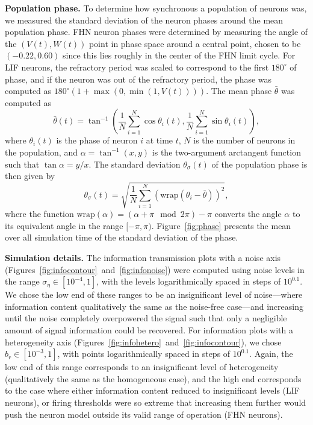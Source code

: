 \documentclass[12pt]{article}
\begin{document}
\textbf{Population phase.} To determine how synchronous a population of neurons was, we measured the standard deviation of the neuron phases around the mean population phase. FHN neuron phases were determined by measuring the angle of the $(V(t),W(t))$ point in phase space around a central point, chosen to be $(-0.22,0.60)$ since this lies roughly in the center of the FHN limit cycle. For LIF neurons, the refractory period was scaled to correspond to the first $180^\circ$ of phase, and if the neuron was out of the refractory period, the phase was computed as $180^\circ ( 1 + \max(0,\min(1,V(t))) )$. The mean phase $\bar\theta$ was computed as
\begin{equation}
  \bar\theta(t) = \tan^{-1} \left( \frac{1}{N}\sum\limits_{i=1}^N \cos\theta_i(t),
                                  \frac{1}{N}\sum\limits_{i=1}^N \sin\theta_i(t) \right),
\end{equation}
where $\theta_i(t)$ is the phase of neuron $i$ at time $t$, $N$ is the number of neurons in the population, and $\alpha = \tan^{-1}(x,y)$ is the two-argument arctangent function such that $\tan\alpha = y/x$. The standard deviation $\theta_\sigma(t)$ of the population phase is then given by
\begin{equation}
  \theta_\sigma(t) = \sqrt{ \frac{1}{N} \sum\limits_{i=1}^N (\mathrm{wrap}(\theta_i - \bar\theta))^2 },
\end{equation}
where the function $\mathrm{wrap}(\alpha) = (\alpha + \pi \mod 2\pi) - \pi$ converts the angle $\alpha$ to its equivalent angle in the range $[-\pi,\pi)$. Figure~\ref{fig:phase} presents the mean over all simulation time of the standard deviation of the phase.

\textbf{Simulation details.} The information transmission plots with a noise axis (Figures~\ref{fig:infocontour}~and~\ref{fig:infonoise}) were computed using noise levels in the range $\sigma_\eta \in [10^{-4},1]$, with the levels logarithmically spaced in steps of $10^{0.1}$. We chose the low end of these ranges to be an insignificant level of noise---where information content qualitatively the same as the noise-free case---and increasing until the noise completely overpowered the signal such that only a negligible amount of signal information could be recovered. For information plots with a heterogeneity axis (Figures~\ref{fig:infohetero}~and~\ref{fig:infocontour}), we chose $b_r \in [10^{-3}, 1]$, with points logarithmically spaced in steps of $10^{0.1}$. Again, the low end of this range corresponds to an insignificant level of heterogeneity (qualitatively the same as the homogeneous case), and the high end corresponds to the case where either information content reduced to insignificant levels (LIF neurons), or firing thresholds were so extreme that increasing them further would push the neuron model outside its valid range of operation (FHN neurons).
\end{document}
